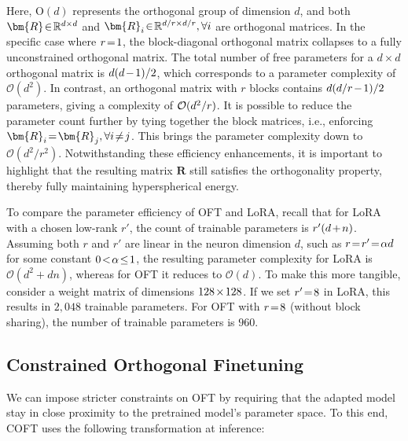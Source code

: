 Here, $\text{O}(d)$ represents the orthogonal group of dimension $d$, and both $\thickmuskip=2mu \medmuskip=2mu \bm{R}\in\mathbb{R}^{d\times d}$ and $\thickmuskip=2mu \medmuskip=2mu \bm{R}_i\in\mathbb{R}^{d/r\times d/r},\forall i$ are orthogonal matrices. In the specific case where $\thickmuskip=2mu \medmuskip=2mu r=1$, the block-diagonal orthogonal matrix collapses to a fully unconstrained orthogonal matrix. The total number of free parameters for a $d \times d$ orthogonal matrix is $\thickmuskip=2mu \medmuskip=2mu d(d-1)/2$, which corresponds to a parameter complexity of $\mathcal{O}(d^2)$. In contrast, an orthogonal matrix with $r$ blocks contains $\thickmuskip=2mu \medmuskip=2mu d(d/r-1)/2$ parameters, giving a complexity of $\thickmuskip=2mu \medmuskip=2mu \mathcal{O}(d^2/r)$. It is possible to reduce the parameter count further by tying together the block matrices, i.e., enforcing $\thickmuskip=2mu \medmuskip=2mu\bm{R}_i=\bm{R}_j,\forall i\neq j$. This brings the parameter complexity down to $\mathcal{O}(d^2/r^2)$. Notwithstanding these efficiency enhancements, it is important to highlight that the resulting matrix $\bm{R}$ still satisfies the orthogonality property, thereby fully maintaining hyperspherical energy.

To compare the parameter efficiency of OFT and LoRA, recall that for LoRA with a chosen low-rank $r'$, the count of trainable parameters is $\thickmuskip=2mu \medmuskip=2mu r'(d+n)$. Assuming both $r$ and $r'$ are linear in the neuron dimension $d$, such as $\thickmuskip=2mu \medmuskip=2mu r=r'=\alpha d$ for some constant $\thickmuskip=2mu \medmuskip=2mu 0<\alpha\leq 1$, the resulting parameter complexity for LoRA is $\mathcal{O}(d^2+dn)$, whereas for OFT it reduces to $\mathcal{O}(d)$. To make this more tangible, consider a weight matrix of dimensions $\thickmuskip=2mu \medmuskip=2mu 128\times 128$. If we set $\thickmuskip=2mu \medmuskip=2mu r'=8$ in LoRA, this results in $2,048$ trainable parameters. For OFT with $\thickmuskip=2mu \medmuskip=2mu r=8$ (without block sharing), the number of trainable parameters is $960$.

\subsection{Constrained Orthogonal Finetuning}

We can impose stricter constraints on OFT by requiring that the adapted model stay in close proximity to the pretrained model’s parameter space. To this end, COFT uses the following transformation at inference:

